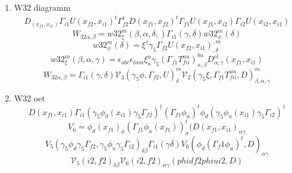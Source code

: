 \documentclass{article}[12pt]
\begin{document}
\begin{itemize}
\begin{enumerate}
\item W32 diagramm
\begin{eqnarray}
D_(x_{f1},x_{i1})\Gamma_{i1}U(x_{f2},x_{i1})^t\Gamma_{f2}^tD(x_{f1},x_{f2})^t\Gamma_{f1}U(x_{f1},x_{i2})\Gamma_{i2}U(x_{i2},x_{i1})
\end{eqnarray}
$$
W_{32\alpha,\beta}=w32_{\xi}^{m}\left(\beta,\alpha,\delta,\right)\Gamma_{i1}\left(\gamma,\delta\right)w32_{\phi}^{m}\left(\delta\right)
$$
$$
w32_{\phi}^{m}\left(\delta\right)=\xi^{\dagger}\gamma_5\Gamma_{f2}U\left(x_{f2},x_{i1}\right)^{,m}_{,\delta}
$$
$$
w32_{\xi}^{m}\left(\beta,\alpha,\gamma\right)=\epsilon_{abc}\epsilon_{lmn}\xi^{a}_{\kappa}\gamma_5\left(\Gamma_{f1}T_{fii}^{uu}\right)^{bn}_{\kappa,\beta}D^{cl}_{\alpha,\gamma}\left(x_{f1},x_{i1}\right)
$$
$$
W_{32\alpha,\beta}=\Gamma_{i1}\left(\gamma,\delta\right){\mathcal V}_{3}\left(\gamma_5\phi,\Gamma_{f2},U\right)^{m}_{\delta}{\mathcal V}_{2}\left(\gamma_5\xi,\Gamma_{f1}T_{fii}^{uu},D\right)^{m}_{\beta,\alpha,\gamma}
$$
\item W32 oet
$$
D(x_{f1},x_{i1})\Gamma_{i1}(\gamma_5\phi_d(x_{i1})\gamma_5\Gamma_{f2})^\dagger
(\Gamma_{f1}\phi_u)^t\phi_d(\gamma_5\phi_u(x_{i1})\gamma_5\Gamma_{i2})^\dagger 
$$
$$
V_6=\phi_d(x_{f1})_{\sigma}(\Gamma_{f1}\phi_u(x_{f1}))^t_{\sigma}(D(x_{f1},x_{i1})_{\alpha\gamma}
$$
$$
V_5(\gamma_5\phi_d\gamma_5\Gamma_{f2},\gamma_5\phi_u\gamma_5\Gamma_{i2})_{\delta\beta}\Gamma_{i1}(\gamma\delta)V_6(\phi_d(\Gamma_f1\phi_u)^t,D)_{\alpha\gamma}
$$
$$
{\mathcal V}_5(i2,f2)_{\delta\beta}{\mathcal V}_6(i2,f2)_{\alpha\gamma}(phidf2phiui2,D)
$$


\end{enumerate}
\end{itemize}
\end{document}
